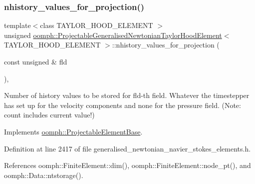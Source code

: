\subsubsection{\texorpdfstring{nhistory\+\_\+values\+\_\+for\+\_\+projection()}{nhistory\_values\_for\_projection()}}
{\footnotesize\ttfamily template$<$class T\+A\+Y\+L\+O\+R\+\_\+\+H\+O\+O\+D\+\_\+\+E\+L\+E\+M\+E\+NT $>$ \\
unsigned \hyperlink{classoomph_1_1ProjectableGeneralisedNewtonianTaylorHoodElement}{oomph\+::\+Projectable\+Generalised\+Newtonian\+Taylor\+Hood\+Element}$<$ T\+A\+Y\+L\+O\+R\+\_\+\+H\+O\+O\+D\+\_\+\+E\+L\+E\+M\+E\+NT $>$\+::nhistory\+\_\+values\+\_\+for\+\_\+projection (\begin{DoxyParamCaption}\item[{const unsigned \&}]{fld }\end{DoxyParamCaption})\hspace{0.3cm}{\ttfamily [inline]}, {\ttfamily [virtual]}}



Number of history values to be stored for fld-\/th field. Whatever the timestepper has set up for the velocity components and none for the pressure field. (Note\+: count includes current value!) 



Implements \hyperlink{classoomph_1_1ProjectableElementBase_ac6790f394630b964663281f8740f43a5}{oomph\+::\+Projectable\+Element\+Base}.



Definition at line 2417 of file generalised\+\_\+newtonian\+\_\+navier\+\_\+stokes\+\_\+elements.\+h.



References oomph\+::\+Finite\+Element\+::dim(), oomph\+::\+Finite\+Element\+::node\+\_\+pt(), and oomph\+::\+Data\+::ntstorage().

\mbox{\label{classoomph_1_1ProjectableGeneralisedNewtonianTaylorHoodElement_a44ae0637efb48b6dc0c2f886bf39e376}} 
